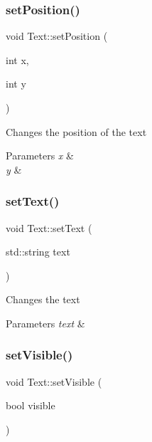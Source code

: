 \subsubsection{\texorpdfstring{set\+Position()}{setPosition()}}
{\footnotesize\ttfamily void Text\+::set\+Position (\begin{DoxyParamCaption}\item[{int}]{x,  }\item[{int}]{y }\end{DoxyParamCaption})}



Changes the position of the text 


\begin{DoxyParams}{Parameters}
{\em x} & \\
\hline
{\em y} & \\
\hline
\end{DoxyParams}
\mbox{\label{class_text_ab2d8c95b3d746ae3e8c0fba8318743c9}} 
\subsubsection{\texorpdfstring{set\+Text()}{setText()}}
{\footnotesize\ttfamily void Text\+::set\+Text (\begin{DoxyParamCaption}\item[{std\+::string}]{text }\end{DoxyParamCaption})}



Changes the text 


\begin{DoxyParams}{Parameters}
{\em text} & \\
\hline
\end{DoxyParams}
\mbox{\label{class_text_a654ac74524e48652f9aa789d2612052b}} 
\subsubsection{\texorpdfstring{set\+Visible()}{setVisible()}}
{\footnotesize\ttfamily void Text\+::set\+Visible (\begin{DoxyParamCaption}\item[{bool}]{visible }\end{DoxyParamCaption})}



